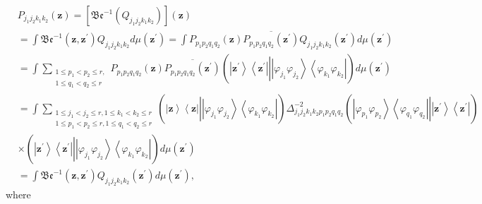 \documentclass[aps,preprint]{revtex4}%
\begin{document}
\begin{align}
&  P_{j_{1}j_{2}k_{1}k_{2}}\left(  \mathbf{z}\right)  =\left[  \mathfrak{Be}%
^{-1}\left(  Q_{j_{1}j_{2}k_{1}k_{2}}\right)  \right]  \left(  \mathbf{z}%
\right) \nonumber\\
&  =\int\mathfrak{Be}^{-1}\left(  \mathbf{z,z}^{\prime}\right)  Q_{j_{1}%
j_{2}k_{1}k_{2}}d\mu\left(  \mathbf{z}^{\prime}\right)  =\int P_{p_{1}%
p_{2}q_{1}q_{2}}\left(  \mathbf{z}\right)  \overline{P_{p_{1}p_{2}q_{1}q_{2}%
}\left(  \mathbf{z}^{\prime}\right)  }Q_{j_{1}j_{2}k_{1}k_{2}}\left(
\mathbf{z}^{\prime}\right)  d\mu\left(  \mathbf{z}^{\prime}\right) \nonumber\\
&  =\int\sum_{\substack{1\leq p_{1}<p_{2}\leq r,\\1\leq q_{1}<q_{2}\leq
r}}P_{p_{1}p_{2}q_{1}q_{2}}\left(  \mathbf{z}\right)  \overline{P_{p_{1}%
p_{2}q_{1}q_{2}}\left(  \mathbf{z}^{\prime}\right)  }\left(  \left\vert
\mathbf{z}^{\prime}\right\rangle \left\langle \mathbf{z}^{\prime}\right\vert
\left\vert \overset{}{\left\vert \varphi_{j_{1}}\varphi_{j_{2}}\right\rangle
\left\langle \varphi_{k_{1}}\varphi_{k_{2}}\right\vert }\right.  \right)
d\mu\left(  \mathbf{z}^{\prime}\right) \nonumber\\
&  =\int\sum_{\substack{1\leq j_{1}<j_{2}\leq r,1\leq k_{1}<k_{2}\leq r\\1\leq
p_{1}<p_{2}\leq r,1\leq q_{1}<q_{2}\leq r}}\left(  \left\vert \mathbf{z}%
\right\rangle \left\langle \mathbf{z}\right\vert \left\vert
\overset{}{\left\vert \varphi_{j_{1}}\varphi_{j_{2}}\right\rangle \left\langle
\varphi_{k_{1}}\varphi_{k_{2}}\right\vert }\right.  \right)  \Delta
_{j_{1}j_{2}k_{1}k_{2}p_{1}p_{2}q_{1}q_{2}}^{-2}\left(  \left.
\overset{}{\left\vert \varphi_{p_{1}}\varphi_{p_{2}}\right\rangle \left\langle
\varphi_{q_{1}}\varphi_{q_{2}}\right\vert }\right\vert \left\vert
\mathbf{z}^{\prime}\right\rangle \left\langle \mathbf{z}^{\prime}\right\vert
\right) \nonumber\\
&  \times\left(  \left\vert \mathbf{z}^{\prime}\right\rangle \left\langle
\mathbf{z}^{\prime}\right\vert \left\vert \overset{}{\left\vert \varphi
_{j_{1}}\varphi_{j_{2}}\right\rangle \left\langle \varphi_{k_{1}}%
\varphi_{k_{2}}\right\vert }\right.  \right)  d\mu\left(  \mathbf{z}^{\prime
}\right) \nonumber\\
&  =\int\mathfrak{Be}^{-1}\left(  \mathbf{z,z}^{\prime}\right)  Q_{j_{1}%
j_{2}k_{1}k_{2}}\left(  \mathbf{z}^{\prime}\right)  d\mu\left(  \mathbf{z}%
^{\prime}\right)  ,
\end{align}
where
\end{document}
